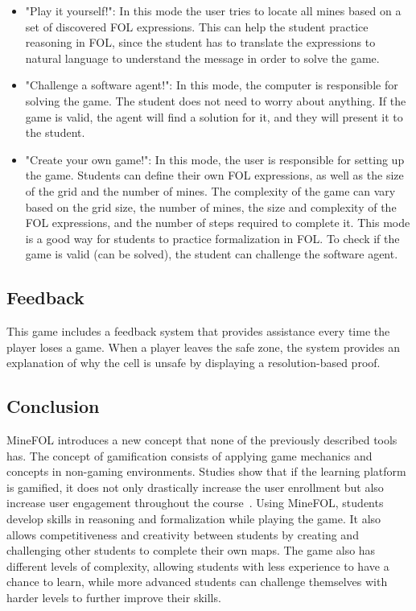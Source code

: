 \begin{itemize}
    \item "Play it yourself!": In this mode the user tries to locate all mines based on a set of discovered \gls{FOL} expressions. This can help the student practice reasoning in \gls{FOL}, since the student has to translate the expressions to natural language to understand the message in order to solve the game.
    \item "Challenge a software agent!": In this mode, the computer is responsible for solving the game. The student does not need to worry about anything. If the game is valid, the agent will find a solution for it, and they will present it to the student.
    \item "Create your own game!": In this mode, the user is responsible for setting up the game. Students can define their own \gls{FOL} expressions, as well as the size of the grid and the number of mines. The complexity of the game can vary based on the grid size, the number of mines, the size and complexity of the \gls{FOL} expressions, and the number of steps required to complete it. This mode is a good way for students to practice formalization in \gls{FOL}. To check if the game is valid (can be solved), the student can challenge the software agent.
\end{itemize}

\subsection{Feedback}
This game includes a feedback system that provides assistance every time the player loses a game. When a player leaves the safe zone, the system provides an explanation of why the cell is unsafe by displaying a resolution-based proof.

\subsection{Conclusion}
MineFOL introduces a new concept that none of the previously described tools has. The concept of gamification consists of applying game mechanics and concepts in non-gaming environments. Studies show that if the learning platform is gamified, it does not only drastically increase the user enrollment but also increase user engagement throughout the course~\cite{vaibhav_gamification}. Using MineFOL, students develop skills in reasoning and formalization while playing the game. It also allows competitiveness and creativity between students by creating and challenging other students to complete their own maps. The game also has different levels of complexity, allowing students with less experience to have a chance to learn, while more advanced students can challenge themselves with harder levels to further improve their skills.
